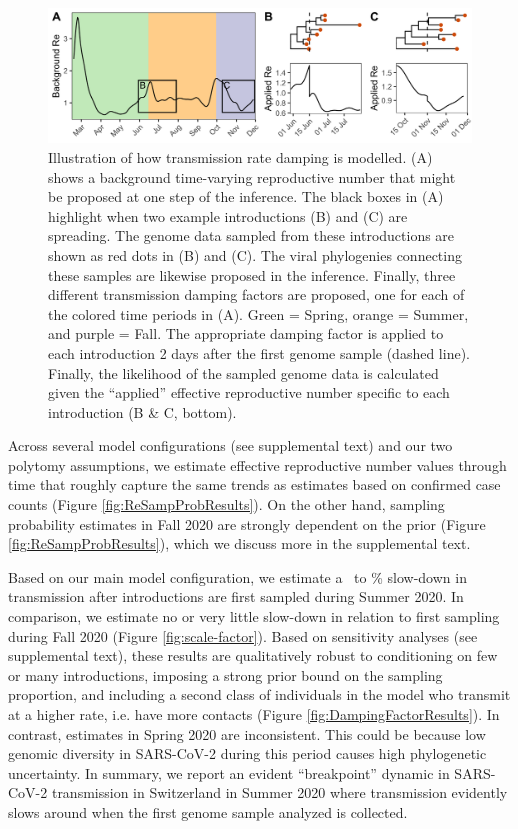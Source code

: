 \documentclass[9pt,twoside,lineno]{pnas-new} %
\begin{document}
\begin{figure}[h!]
\centering
\includegraphics[width=0.75\linewidth]{figures/phylodynamic_method_example.png}
\caption{Illustration of how transmission rate damping is modelled. (A) shows a background time-varying reproductive number that might be proposed at one step of the inference. The black boxes in (A) highlight when two example introductions (B) and (C) are spreading. The genome data sampled from these introductions are shown as red dots in (B) and (C). The viral phylogenies connecting these samples are likewise proposed in the inference. Finally, three different transmission damping factors are proposed, one for each of the colored time periods in (A). Green = Spring, orange = Summer, and purple = Fall. The appropriate damping factor is applied to each introduction 2 days after the first genome sample (dashed line). Finally, the likelihood of the sampled genome data is calculated given the ``applied'' effective reproductive number specific to each introduction (B \& C, bottom).}  
\label{fig:phylo-methods}
\end{figure}

Across several model configurations (see supplemental text) and our two polytomy assumptions, we estimate effective reproductive number values through time that roughly capture the same trends as estimates based on confirmed case counts (Figure \ref{fig:ReSampProbResults}). On the other hand, sampling probability estimates in Fall 2020 are strongly dependent on the prior (Figure \ref{fig:ReSampProbResults}), which we discuss more in the supplemental text.

Based on our main model configuration, we estimate a \summermaxdampingpercentmedianCHEnosampUB\ to \summermindampingpercentmedianCHEnosampUB\% slow-down in transmission after introductions are first sampled during Summer 2020. In comparison, we estimate no or very little slow-down in relation to first sampling during Fall 2020 (Figure \ref{fig:scale-factor}). Based on sensitivity analyses (see supplemental text), these results are qualitatively robust to conditioning on few or many introductions, imposing a strong prior bound on the sampling proportion, and including a second class of individuals in the model who transmit at a higher rate, i.e. have more contacts (Figure \ref{fig:DampingFactorResults}). In contrast, estimates in Spring 2020 are inconsistent. This could be because low genomic diversity in SARS-CoV-2 during this period causes high phylogenetic uncertainty. In summary, we report an evident ``breakpoint'' dynamic in SARS-CoV-2 transmission in Switzerland in Summer 2020 where transmission evidently slows around when the first genome sample analyzed is collected.
\end{document}

